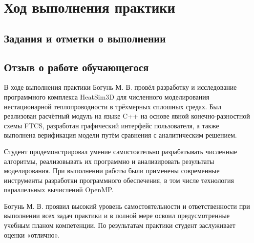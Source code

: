 \chapter*{Ход выполнения практики}

\section*{Задания и отметки о выполнении}







\clearpage
\section*{Отзыв о работе обучающегося}

В ходе выполнения практики Богунь М. В. провёл разработку и 
исследование программного комплекса HeatSim3D для численного 
моделирования нестационарной теплопроводности в трёхмерных 
сплошных средах. Был реализован расчётный модуль на языке C++ 
на основе явной конечно-разностной схемы FTCS, разработан 
графический интерфейс пользователя, а также выполнена верификация 
модели путём сравнения с аналитическим решением.

Студент продемонстрировал умение самостоятельно разрабатывать 
численные алгоритмы, реализовывать их программно и анализировать 
результаты моделирования. При выполнении работы были применены 
современные инструменты разработки программного обеспечения, 
в том числе технология параллельных вычислений OpenMP.

Богунь М. В. проявил высокий уровень самостоятельности и 
ответственности при выполнении всех задач практики и в полной 
мере освоил предусмотренные учебным планом компетенции. 
По результатам практики студент заслуживает оценки «отлично».

\progressapprov